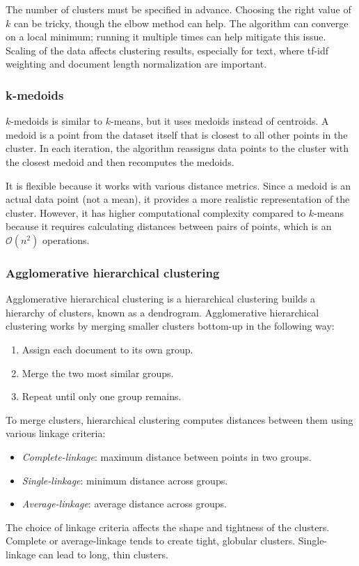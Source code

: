 The number of clusters must be specified in advance.
Choosing the right value of $k$ can be tricky, though the elbow method can help.
The algorithm can converge on a local minimum; running it multiple times can help mitigate this issue.
Scaling of the data affects clustering results, especially for text, where tf-idf weighting and document length normalization are important.

\subsubsection{k-medoids}
$k$-medoids is similar to $k$-means, but it uses medoids instead of centroids.
A medoid is a point from the dataset itself that is closest to all other points in the cluster.
In each iteration, the algorithm reassigns data points to the cluster with the closest medoid and then recomputes the medoids.

It is flexible because it works with various distance metrics. 
Since a medoid is an actual data point (not a mean), it provides a more realistic representation of the cluster.
However, it has higher computational complexity compared to $k$-means because it requires calculating distances between pairs of points, which is an $\mathcal{O}(n^2)$ operations.

\subsubsection{Agglomerative hierarchical clustering}
Agglomerative hierarchical clustering is a hierarchical clustering builds a hierarchy of clusters, known as a dendrogram.
Agglomerative hierarchical clustering works by merging smaller clusters bottom-up in the following way: 
\begin{enumerate}
    \item Assign each document to its own group.
    \item Merge the two most similar groups.
    \item Repeat until only one group remains.
\end{enumerate}
\noindent To merge clusters, hierarchical clustering computes distances between them using various linkage criteria:
\begin{itemize}
    \item \textit{Complete-linkage}: maximum distance between points in two groups.
    \item \textit{Single-linkage}: minimum distance across groups.
    \item \textit{Average-linkage}: average distance across groups.
\end{itemize}
\noindent The choice of linkage criteria affects the shape and tightness of the clusters. 
Complete or average-linkage tends to create tight, globular clusters.
Single-linkage can lead to long, thin clusters.

